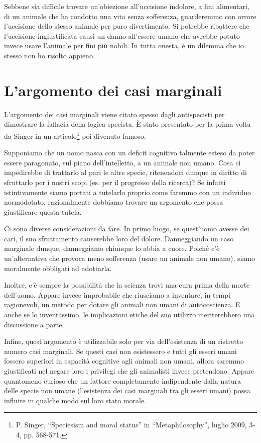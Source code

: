\documentclass[a4paper,11pt,oneside,article]{memoir}
\begin{document}
Sebbene sia difficile trovare un'obiezione all'uccisione indolore, a fini
alimentari, di un animale che ha condotto una vita senza sofferenza, guarderemmo
con orrore l'uccisione dello stesso animale per puro divertimento. Si potrebbe
ribattere che l'uccisione ingiustificata causi un danno all'essere umano che
avrebbe potuto invece usare l'animale per fini più nobili. In tutta onesta, è un
dilemma che io stesso non ho risolto appieno.

\section{L'argomento dei casi marginali}

L'argomento dei casi marginali viene citato spesso dagli antispecisti per
dimostrare la fallacia della logica specista. È stato presentato per la prima
volta da Singer in un articolo\footnote{P. Singer, ``Speciesism and moral
status'' in ``Metaphilosophy'', luglio 2009, 3-4, pp. 568-571.} poi divenuto
famoso.

Supponiamo che un uomo nasca con un deficit cognitivo talmente esteso da poter
essere paragonato, sul piano dell'intelletto, a un animale non umano. Cosa ci
impedirebbe di trattarlo al pari le altre specie, ritenendoci dunque in diritto
di sfruttarlo per i nostri scopi (es. per il progresso della ricerca)? Se
infatti istintivamente siamo portati a tutelarlo proprio come faremmo con un
individuo normodotato, razionalmente dobbiamo trovare un argomento che possa
giustificare questa tutela.

Ci sono diverse considerazioni da fare. In primo luogo, se quest'uomo avesse dei
cari, il suo sfruttamento causerebbe loro del dolore. Danneggiando un caso
marginale dunque, danneggiamo chiunque lo abbia a cuore. Poiché c'è
un'alternativa che provoca meno sofferenza (usare un animale non umano), siamo
moralmente obbligati ad adottarla.

Inoltre, c'è sempre la possibilità che la scienza trovi una cura prima della
morte dell'uomo. Appare invece improbabile che riusciamo a inventare, in tempi
ragionevoli, un metodo per dotare gli animali non umani di autocoscienza. E
anche se lo inventassimo, le implicazioni etiche del suo utilizzo meriterebbero
una discussione a parte.

Infine, quest'argomento è utilizzabile solo per via dell'esistenza di un
ristretto numero casi marginali. Se questi casi non esistessero e tutti gli
esseri umani fossero superiori in capacità cognitive agli animali non umani,
allora saremmo giustificati nel negare loro i privilegi che gli animalisti
invece pretendono. Appare quantomeno curioso che un fattore completamente
indipendente dalla natura delle specie non umane (l'esistenza dei casi marginali
tra gli esseri umani) possa influire in qualche modo sul loro stato morale.
\end{document}
